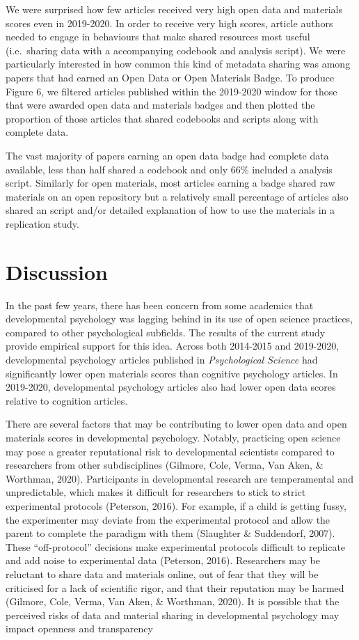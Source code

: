 \documentclass[
  english,
  man,floatsintext]{apa6}
\begin{document}
We were surprised how few articles received very high open data and materials scores even in 2019-2020. In order to receive very high scores, article authors needed to engage in behaviours that make shared resources most useful (i.e.~sharing data with a accompanying codebook and analysis script). We were particularly interested in how common this kind of metadata sharing was among papers that had earned an Open Data or Open Materials Badge. To produce Figure 6, we filtered articles published within the 2019-2020 window for those that were awarded open data and materials badges and then plotted the proportion of those articles that shared codebooks and scripts along with complete data.

The vast majority of papers earning an open data badge had complete data available, less than half shared a codebook and only 66\% included a analysis script. Similarly for open materials, most articles earning a badge shared raw materials on an open repository but a relatively small percentage of articles also shared an script and/or detailed explanation of how to use the materials in a replication study.

\hypertarget{discussion}{%
\section{Discussion}\label{discussion}}

In the past few years, there has been concern from some academics that developmental psychology was lagging behind in its use of open science practices, compared to other psychological subfields. The results of the current study provide empirical support for this idea. Across both 2014-2015 and 2019-2020, developmental psychology articles published in \emph{Psychological Science} had significantly lower open materials scores than cognitive psychology articles. In 2019-2020, developmental psychology articles also had lower open data scores relative to cognition articles.

There are several factors that may be contributing to lower open data and open materials scores in developmental psychology. Notably, practicing open science may pose a greater reputational risk to developmental scientists compared to researchers from other subdisciplines (Gilmore, Cole, Verma, Van Aken, \& Worthman, 2020). Participants in developmental research are temperamental and unpredictable, which makes it difficult for researchers to stick to strict experimental protocols (Peterson, 2016). For example, if a child is getting fussy, the experimenter may deviate from the experimental protocol and allow the parent to complete the paradigm with them (Slaughter \& Suddendorf, 2007). These ``off-protocol'' decisions make experimental protocols difficult to replicate and add noise to experimental data (Peterson, 2016). Researchers may be reluctant to share data and materials online, out of fear that they will be criticised for a lack of scientific rigor, and that their reputation may be harmed (Gilmore, Cole, Verma, Van Aken, \& Worthman, 2020). It is possible that the perceived risks of data and material sharing in developmental psychology may impact openness and transparency
\end{document}
